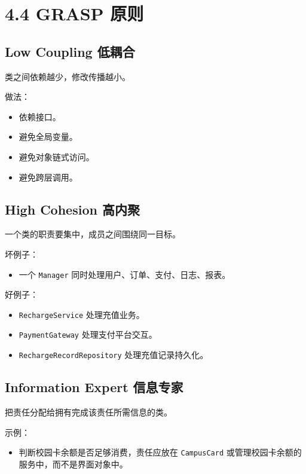 \documentclass[UTF8,zihao=-4]{ctexart}
\begin{document}
\section{4.4 GRASP 原则}

\subsection{Low Coupling 低耦合}

类之间依赖越少，修改传播越小。

做法：

\begin{itemize}
\item 依赖接口。
\item 避免全局变量。
\item 避免对象链式访问。
\item 避免跨层调用。
\end{itemize}

\subsection{High Cohesion 高内聚}

一个类的职责要集中，成员之间围绕同一目标。

坏例子：

\begin{itemize}
\item 一个 \texttt{Manager} 同时处理用户、订单、支付、日志、报表。
\end{itemize}

好例子：

\begin{itemize}
\item \texttt{RechargeService} 处理充值业务。
\item \texttt{PaymentGateway} 处理支付平台交互。
\item \texttt{RechargeRecordRepository} 处理充值记录持久化。
\end{itemize}

\subsection{Information Expert 信息专家}

把责任分配给拥有完成该责任所需信息的类。

示例：

\begin{itemize}
\item 判断校园卡余额是否足够消费，责任应放在 \texttt{CampusCard} 或管理校园卡余额的服务中，而不是界面对象中。
\end{itemize}
\end{document}
